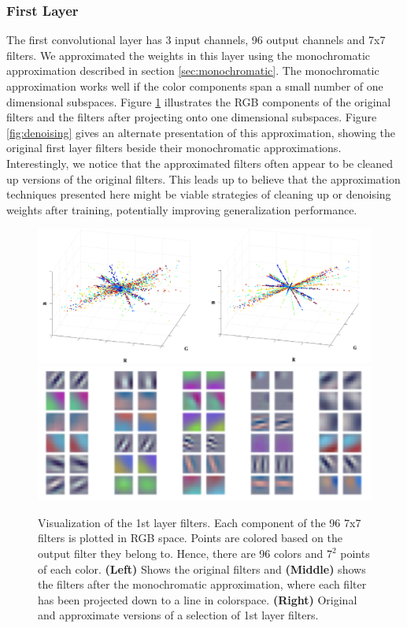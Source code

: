 
\subsubsection{First Layer}

The first convolutional layer has 3 input channels, 96
output channels and 7x7 filters.  We approximated the weights in this
layer using the monochromatic approximation described in section
\ref{sec:monochromatic}. The monochromatic approximation works well if
the color components span a small number of one dimensional
subspaces. Figure \ref{fig:RGB_components} illustrates the RGB components of the original filters and the filters after
projecting onto one dimensional subspaces. Figure \ref{fig:denoising} gives an alternate
presentation of this approximation, showing the original first layer
filters beside their monochromatic approximations.  Interestingly, we
notice that the approximated filters often appear to be cleaned up
versions of the original filters. This leads up to believe that the
approximation techniques presented here might be viable strategies of
cleaning up or denoising weights after training, potentially improving generalization performance.

\begin{figure}[t]
\centering
\begin{minipage}{\textwidth}
	\includegraphics[width=0.5\linewidth]{img/RGB_components_stacked.pdf}
	\quad
	\includegraphics[width=0.5\linewidth]{img/denoised_stacked.pdf} 
\end{minipage}
\vspace{-3mm}
\label{fig:RGB_components}
\caption{Visualization of the 1st layer filters. Each component of the 96 7x7 filters is plotted in RGB space. Points are colored based on the output filter they belong to. Hence, there are 96 colors and $7^2$ points of each color. {\bf (Left)} Shows the
  original filters and {\bf (Middle)} shows the filters after the monochromatic approximation, where each filter has been projected down to a line in colorspace. {\bf (Right)} Original and approximate versions of a selection of 1st layer filters.}
\end{figure}




